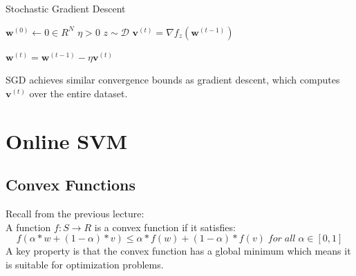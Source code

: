 \documentclass[11pt]{article}
\def\DD{\mathcal{D}}
\begin{document}
\begin{algorithm}[H]
\caption{Stochastic Gradient Descent}
\label{algo:sgd}
\begin{algorithmic}[1]
\STATE $\textbf{w}^{(0)} \leftarrow 0 \in R^N$ \hfill
\STATE $\eta > 0$ \hfill
{}
\STATE $z \sim \DD$ \hfill 
\STATE $\mathbf{v}^{(t)} = \nabla f_z (\mathbf{w}^{(t-1)})$ \hfill 

\STATE $\mathbf{w}^{(t)} =  \mathbf{w}^{(t-1)} - \eta\mathbf{v}^{(t)}$  \hfill 
\ENDFOR
\end{algorithmic}
\end{algorithm}

SGD achieves similar convergence bounds as gradient descent, which computes $\mathbf{v}^{(t)}$ over the entire dataset.


        


\section{Online SVM}
\subsection{Convex Functions}
Recall from the previous lecture: \\
A function $f:S \rightarrow R$ is a convex function if it satisfies:
$$f(\alpha*w + (1-\alpha)*v) \leq \alpha*f(w) +(1-\alpha)*f(v) \; for \; all \; \alpha \in [0,1] $$
A key property is that the convex function has a global minimum which means it is suitable for optimization problems. 
\end{document}
